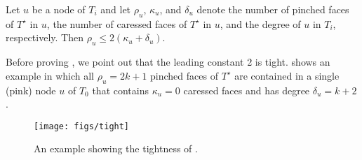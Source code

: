\documentclass{patmorin}
\newcommand{\dual}[1]{{#1}^\star}
\begin{document}
\begin{lem}
   Let $u$ be a node of $T_i$ and let $\rho_u$, $\kappa_u$, and $\delta_u$ denote the number of pinched faces of $\dual{T}$ in $u$, the number of caressed faces of $\dual{T}$ in $u$, and the degree of $u$ in $T_i$, respectively.  Then $\rho_u \le 2(\kappa_u+\delta_u)$.
\end{lem}

Before proving , we point out that
the leading constant 2 is tight.  shows an example in
which all $\rho_u=2k+1$ pinched faces of $\dual{T}$ are contained in a
single (pink) node $u$ of $T_0$ that contains $\kappa_u=0$ caressed faces and
has degree $\delta_u=k+2$.

\begin{figure}
  \begin{center}
    \texttt{[image: figs/tight]}
  \end{center}
  \caption{An example showing the tightness of .}
\end{figure}
\end{document}
